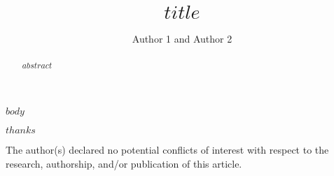 \documentclass[Afour,sageh,times]{sagej}
\begin{document}

\title{$title$}

\author{Author 1 and Author 2}




\begin{abstract}
$abstract$
\end{abstract}


\maketitle

\noindent $body$

\begin{acks}
$thanks$
\end{acks}

\begin{dci}
The author(s) declared no potential conflicts of interest with respect to the 
research, authorship, and/or publication of this article.
\end{dci}



\theendnotes



\end{document}
